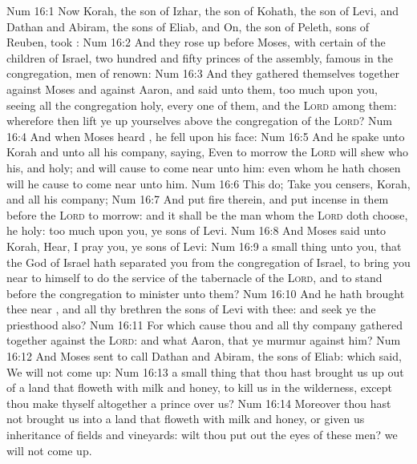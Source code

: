\vs Num 16:1 Now Korah, the son of Izhar, the son of Kohath, the son of Levi, and Dathan and Abiram, the sons of Eliab, and On, the son of Peleth, sons of Reuben, took :
\vs Num 16:2 And they rose up before Moses, with certain of the children of Israel, two hundred and fifty princes of the assembly, famous in the congregation, men of renown:
\vs Num 16:3 And they gathered themselves together against Moses and against Aaron, and said unto them,  too much upon you, seeing all the congregation  holy, every one of them, and the \textsc{Lord}  among them: wherefore then lift ye up yourselves above the congregation of the \textsc{Lord}?
\vs Num 16:4 And when Moses heard , he fell upon his face:
\vs Num 16:5 And he spake unto Korah and unto all his company, saying, Even to morrow the \textsc{Lord} will shew who  his, and  holy; and will cause  to come near unto him: even  whom he hath chosen will he cause to come near unto him.
\vs Num 16:6 This do; Take you censers, Korah, and all his company;
\vs Num 16:7 And put fire therein, and put incense in them before the \textsc{Lord} to morrow: and it shall be  the man whom the \textsc{Lord} doth choose, he  holy:  too much upon you, ye sons of Levi.
\vs Num 16:8 And Moses said unto Korah, Hear, I pray you, ye sons of Levi:
\vs Num 16:9  a small thing unto you, that the God of Israel hath separated you from the congregation of Israel, to bring you near to himself to do the service of the tabernacle of the \textsc{Lord}, and to stand before the congregation to minister unto them?
\vs Num 16:10 And he hath brought thee near , and all thy brethren the sons of Levi with thee: and seek ye the priesthood also?
\vs Num 16:11 For which cause  thou and all thy company  gathered together against the \textsc{Lord}: and what  Aaron, that ye murmur against him?
\vs Num 16:12 And Moses sent to call Dathan and Abiram, the sons of Eliab: which said, We will not come up:
\vs Num 16:13  a small thing that thou hast brought us up out of a land that floweth with milk and honey, to kill us in the wilderness, except thou make thyself altogether a prince over us?
\vs Num 16:14 Moreover thou hast not brought us into a land that floweth with milk and honey, or given us inheritance of fields and vineyards: wilt thou put out the eyes of these men? we will not come up.
